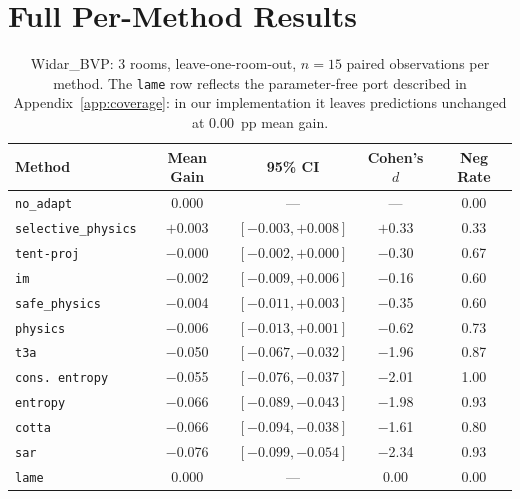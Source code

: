 \section{Full Per-Method Results}
\label{app:per_method_full}

\begin{table}[h]
\centering
\caption{Widar\_BVP: 3 rooms, leave-one-room-out, $n{=}15$ paired observations per method. The \texttt{lame} row reflects the parameter-free port described in Appendix~\ref{app:coverage}: in our implementation it leaves predictions unchanged at 0.00~pp mean gain.}
\label{tab:widar}
\small
\begin{tabular}{lcccc}
\toprule
\textbf{Method} & \textbf{Mean Gain} & \textbf{95\% CI} & \textbf{Cohen's $d$} & \textbf{Neg Rate} \\
\midrule
\texttt{no\_adapt} & 0.000 & --- & --- & 0.00 \\
\texttt{selective\_physics} & $+$0.003 & $[-0.003, +0.008]$ & $+$0.33 & 0.33 \\
\texttt{tent-proj} & $-$0.000 & $[-0.002, +0.000]$ & $-$0.30 & 0.67 \\
\texttt{im} & $-$0.002 & $[-0.009, +0.006]$ & $-$0.16 & 0.60 \\
\texttt{safe\_physics} & $-$0.004 & $[-0.011, +0.003]$ & $-$0.35 & 0.60 \\
\texttt{physics} & $-$0.006 & $[-0.013, +0.001]$ & $-$0.62 & 0.73 \\
\texttt{t3a} & $-$0.050 & $[-0.067, -0.032]$ & $-$1.96 & 0.87 \\
\texttt{cons.~entropy} & $-$0.055 & $[-0.076, -0.037]$ & $-$2.01 & 1.00 \\
\texttt{entropy} & $-$0.066 & $[-0.089, -0.043]$ & $-$1.98 & 0.93 \\
\texttt{cotta} & $-$0.066 & $[-0.094, -0.038]$ & $-$1.61 & 0.80 \\
\texttt{sar} & $-$0.076 & $[-0.099, -0.054]$ & $-$2.34 & 0.93 \\
\texttt{lame} & $0.000$ & --- & $0.00$ & 0.00 \\
\bottomrule
\end{tabular}
\end{table}

